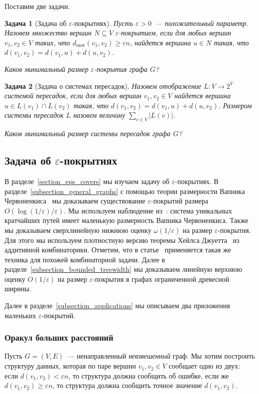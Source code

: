 \documentclass[12pt]{article}
\newcommand{\eps}{\varepsilon}
\newcommand{\dunw}{d_{\mathrm{unw}}}
\newcommand{\abs}[1]{\left|#1\right|}
\DeclareRobustCommand*{\CC}{\,\textendash\,\hskip 0pt}
\newtheorem{problem}{Задача}
\begin{document}
    Поставим две задачи.
    \begin{problem}[Задача об $\eps$-покрытиях]
        Пусть $\eps > 0$~--- положительный параметр. Назовем множество вершин $N \subseteq V$ \emph{$\eps$-покрытием},
        если для любых вершин $v_1, v_2 \in V$ таких, что $\dunw(v_1, v_2) \geq \eps n$, найдется вершина $u \in N$
        такая, что $d(v_1, v_2) = d(v_1, u) + d(u, v_2)$.

        Каков минимальный размер $\eps$-покрытия графа $G$?
    \end{problem}
    \begin{problem}[Задача о системах пересадок]
        Назовем отображение $L \colon V \to 2^V$ \emph{системой пересадок}, если для любых вершин $v_1, v_2 \in V$
        найдется вершина $u \in L(v_1) \cap L(v_2)$ такая, что $d(v_1, v_2) = d(v_1, u) + d(u, v_2)$.
        \emph{Размером} системы пересадок $L$ назовем величину $\sum_{v \in V} \abs{L(v)}$. 

        Каков минимальный размер системы пересадок графа $G$?
    \end{problem}
    \subsection{Задача об $\eps$-покрытиях}
    В разделе~\ref{section_eps_covers} мы изучаем задачу об $\eps$-покрытиях.
    В разделе~\ref{subsection_general_graphs} с помощью теории размерности Вапника\CC Червоненкиса~\cite{VC71}
    мы доказываем существование $\eps$-покрытий размера $O(\log(1 / \eps) / \eps)$.
    Мы используем наблюдение из~\cite{ADFGW11}: система уникальных кратчайших путей имеет маленькую размерность
    Вапника\CC Червоненкиса.
    Также мы доказываем сверхлинейную нижнюю оценку $\omega(1 / \eps)$ на размер $\eps$-покрытия.
    Для этого мы используем плотностную версию теоремы Хейлса\CC Джуетта~\cite{P09} из аддитивной комбинаторики.
    Отметим, что в статье~\cite{A10} применяется такая же техника для похожей комбинаторной задачи.
    Далее в разделе~\ref{subsection_bounded_treewidth} мы доказываем линейную верхнюю оценку $O(1 / \eps)$
    на размер $\eps$-покрытия в графах ограниченной древесной ширины.

    Далее в разделе~\ref{subsection_applications} мы описываем два приложения маленьких $\eps$-покрытий.
    \subsubsection{Оракул больших расстояний}
    Пусть $G = (V, E)$~--- ненаправленный \emph{невзвешенный} граф.
    Мы хотим построить структуру данных, которая по паре вершин $v_1, v_2 \in V$ сообщает одно из двух:
    если $d(v_1, v_2) < \eps n$, то структура должна сообщить об ошибке, если же $d(v_1, v_2) \geq \eps n$,
    то структура должна сообщить точное значение $d(v_1, v_2)$.
\end{document}
